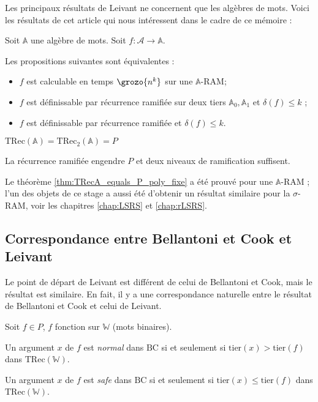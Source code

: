 \documentclass{report}
\newcommand{\bbA}{\mathbb{A}}
\newcommand{\TRec}[1]{\text{TRec}\left(\mathbb{#1}\right)}
\newcommand{\TRecd}[1]{\text{TRec}_{2}\left(\mathbb{#1}\right)}
\begin{document}
		\espace
		
		Les principaux résultats de Leivant ne concernent que les algèbres de mots. Voici les résultats de cet article \cite{Leivant1995} qui nous intéressent dans le cadre de ce mémoire :
		
		\begin{theorem}
			\label{thm:TRecA_equals_P_poly_fixe}
			Soit $\bbA$ une algèbre de mots. Soit $f : \mathcal{A} \to \bbA $.
			
			Les propositions suivantes sont équivalentes :

			\begin{itemize}[itemsep=-1mm]
				\item 	$f$ est calculable en temps $\grozo{n^k}$ sur une $\bbA$-RAM;
				\item 	$f$ est définissable par récurrence ramifiée sur deux tiers $\bbA_0, \bbA_1$ et $\delta(f) \leq k$ ;
				\item 	$f$ est définissable par récurrence ramifiée et $\delta(f) \leq k$.
			\end{itemize}
		\end{theorem}
		
		
		
		\begin{theorem}
			\label{thm:TRecA_equals_P}
			$\TRec{A} = \TRecd{A} = P$
		\end{theorem}
		
		La récurrence ramifiée engendre $P$ et deux niveaux de ramification suffisent.
	
		Le théorème \ref{thm:TRecA_equals_P_poly_fixe} a été prouvé pour une $\bbA$-RAM ; l'un des objets de ce stage a aussi été d'obtenir un résultat similaire pour la $\sigma$-RAM, voir les chapitres \ref{chap:LSRS} et \ref{chap:rLSRS}.
		
		
	
		\subsection{Correspondance entre Bellantoni et Cook et Leivant}
		\label{subsec:corres_BC_Leivant}
	
		Le point de départ de Leivant est différent de celui de Bellantoni et Cook, mais le résultat est similaire. En fait, il y a une correspondance naturelle entre le résultat de Bellantoni et Cook et celui de Leivant.
		
		\begin{lemma}
			\label{lem:BC_and_Leivant}
			Soit $f \in P$, $f$ fonction sur $\mathbb{W}$ (mots binaires).
			
			Un argument $x$ de $f$ est \emph{normal} dans $\text{BC}$ si et seulement si $\text{tier}(x) > \text{tier}(f)$ dans $\TRec{W}$.
			
			Un argument $x$ de $f$ est \emph{safe} dans $\text{BC}$ si et seulement si $\text{tier}(x) \leq \text{tier}(f)$ dans $\TRec{W}$.
		\end{lemma}
		
\end{document}
